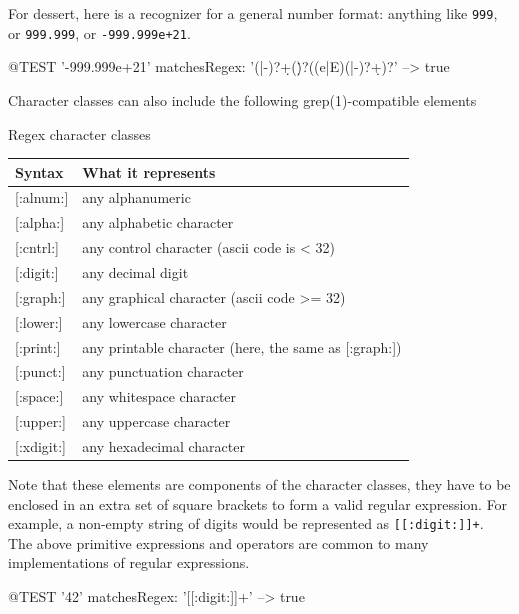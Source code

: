 \documentclass[10pt,twoside,chapterprefix=false]{scrbook}
\newcommand{\codecolor}{\color{blue!65}}
\renewcommand{\ct}{\lstinline[mathescape=false,basicstyle={\sffamily\upshape}]}
\renewcommand{\lct}[1]{{\codecolor\textsf{\textup{#1}}}}
\begin{document}
{For dessert, here is a recognizer for a general number format: anything like \ct{999}, or \ct{999.999}, or \ct{-999.999e+21}.
\begin{ToSh-code}{@TEST}
'-999.999e+21' matchesRegex: '(\+|-)?\d+(\.\d*)?((e|E)(\+|-)?\d+)?' --> true
\end{ToSh-code}

Character classes can also include the following grep(1)-compatible elements

\begin{table}[htb]
\begin{margincap}{Regex character classes}
	\centering
	\begin{tabular}{lp{8cm}}
		\toprule
		Syntax & What it represents \\
		\midrule

\lct{[:alnum:]} & any alphanumeric \\
\lct{[:alpha:]} & any alphabetic character\\
\lct{[:cntrl:]} & any control character (ascii code is \lct{< 32})\\
\lct{[:digit:]} & any decimal digit\\
\lct{[:graph:]} & any graphical character (ascii code \lct{>= 32})\\
\lct{[:lower:]} & any lowercase character\\
\lct{[:print:]} & any printable character (here, the same as \lct{[:graph:]})\\
\lct{[:punct:]} & any punctuation character\\
\lct{[:space:]} & any whitespace character\\
\lct{[:upper:]} & any uppercase character\\
\lct{[:xdigit:]} & any hexadecimal character \\

		\bottomrule
	\end{tabular}
	\end{margincap}
\end{table}

Note that these elements are components of the character classes, \ie they have to be enclosed in an extra set of square brackets to form a valid regular expression.  For example, a non-empty string of digits would be represented as \ct{[[:digit:]]+}. The above primitive expressions and operators are common to many implementations of regular expressions.

\begin{ToSh-code}{@TEST}
'42' matchesRegex: '[[:digit:]]+' --> true
\end{ToSh-code}

}
\end{document}
